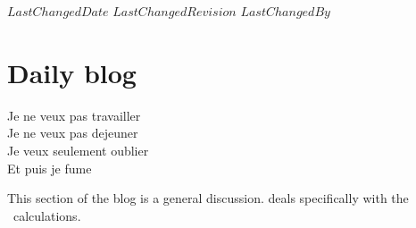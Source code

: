 \ifsvnmulti
 {$LastChangedDate$}
 {$LastChangedRevision$} {$LastChangedBy$}
\fi

\chapter{Daily blog}
\label{c-DailyBlog}

\begin{bartlett}{
Je ne veux pas travailler\\
Je ne veux pas dejeuner\\
Je veux seulement oublier\\
Et puis je fume
            }
\end{bartlett}

\renewcommand{\ssp}{x}
\renewcommand{\vel}{\ensuremath{v}}   %



This section of the blog is a general discussion.
 deals specifically with the
\KS\ calculations.



